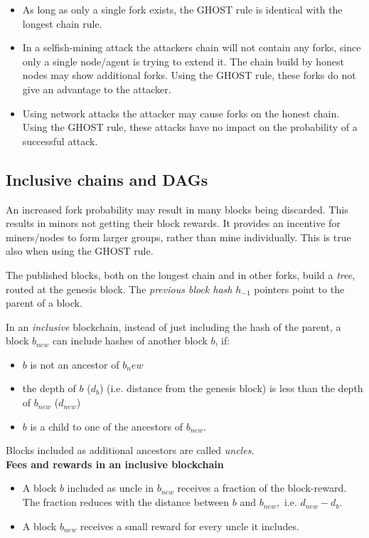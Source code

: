 \begin{note}
	\begin{itemize}
		\item As long as only a single fork exists, the GHOST rule is identical with the longest chain rule.
		\item In a selfish-mining attack the attackers chain will not contain any forks, since only a single node/agent is trying to extend it. The chain build by honest nodes may show additional forks. Using the GHOST rule, these forks do not give an advantage to the attacker.
		\item Using network attacks the attacker may cause forks on the honest chain. Using the GHOST rule, these attacks have no impact on the probability of a successful attack.
	\end{itemize}
\end{note}

\subsection{Inclusive chains and DAGs}
An increased fork probability may result in many blocks being discarded. This results in minors not getting their block rewards. It provides an incentive for miners/nodes to form larger groups, rather than mine individually. 
This is true also when using the GHOST rule.

\begin{definition} The published blocks, both on the longest chain and in other forks, build a \emph{tree}, routed at the genesis block.
The \emph{previous block hash} $h_{-1}$ pointers point to the parent of a block.
\end{definition}
\begin{definition}
	In an \emph{inclusive} blockchain, instead of just including the hash of the parent, a block $b_{new}$ can include hashes of another block $b$, if:
	\begin{itemize}
		\item $b$ is not an ancestor of $b_new$
		\item the depth of $b$ ($d_b$) (i.e. distance from the genesis block) is less than the depth of $b_{new}$ ($d_{new}$)
		\item $b$ is a child to one of the ancestors of $b_{new}$.
	\end{itemize}
	Blocks included as additional ancestors are called \emph{uncles.}\\
	\textbf{Fees and rewards in an inclusive blockchain}
	\begin{itemize}
		\item A block $b$ included as uncle in $b_{new}$ receives a fraction of the block-reward. The fraction reduces with the distance between $b$ and $b_{new}$,~i.e. $d_{new}-d_{b}$.
		\item A block $b_{new}$ receives a small reward for every uncle it includes.
	\end{itemize}
\end{definition}

